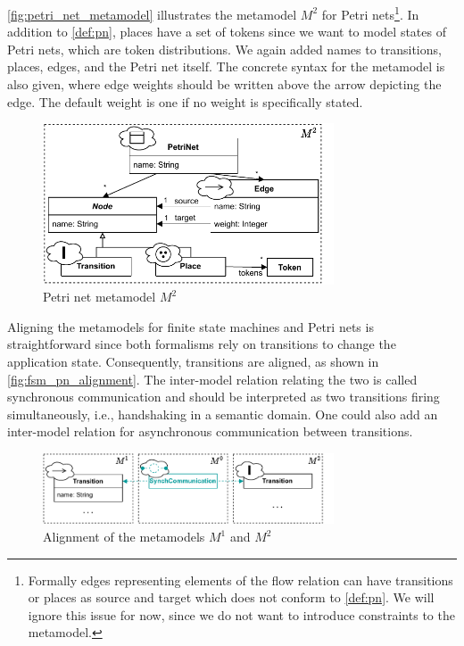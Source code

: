 \documentclass[conference]{IEEEtran}
\begin{document}
\autoref{fig:petri_net_metamodel} illustrates the metamodel $M^2$ for Petri nets\footnote{Formally edges representing elements of the flow relation can have transitions or places as source and target which does not conform to \autoref{def:pn}.
We will ignore this issue for now, since we do not want to introduce constraints to the metamodel.}.
In addition to \autoref{def:pn}, places have a set of tokens since we want to model states of Petri nets, which are token distributions.
We again added names to transitions, places, edges, and the Petri net itself.
The concrete syntax for the metamodel is also given, where edge weights should be written above the arrow depicting the edge.
The default weight is one if no weight is specifically stated.

\begin{figure}[h]
    \centering
    \includegraphics[width=3.4in]{petri_net_metamodel}
    \caption{Petri net metamodel $M^2$}
    \label{fig:petri_net_metamodel}
\end{figure}

Aligning the metamodels for finite state machines and Petri nets is straightforward since both formalisms rely on transitions to change the application state.
Consequently, transitions are aligned, as shown in \autoref{fig:fsm_pn_alignment}.
The inter-model relation relating the two is called synchronous communication and should be interpreted as two transitions firing simultaneously, i.e., handshaking in a semantic domain.
One could also add an inter-model relation for asynchronous communication between transitions.

\begin{figure}[h]
    \centering
    \includegraphics[width=3.4in]{fsm_pn_alignment}
    \caption{Alignment of the metamodels $M^1$ and $M^2$}
    \label{fig:fsm_pn_alignment}
\end{figure}
\end{document}

